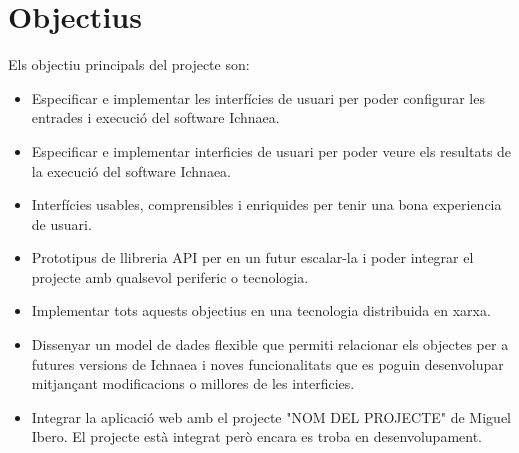 \section{Objectius}
Els objectiu principals del projecte son:

\begin{itemize}
\item Especificar e implementar les interf\'{i}cies de usuari per poder configurar les entrades i execuci\'{o} del software Ichnaea.
\item Especificar e implementar interficies de usuari per poder veure els resultats de la execuci\'{o} del software Ichnaea. 
\item Interf\'{i}cies usables, comprensibles i enriquides per tenir una bona experiencia de usuari. 
\item Prototipus de llibreria API per en un futur escalar-la i poder integrar el projecte amb qualsevol periferic o tecnologia. 
\item Implementar tots aquests objectius en una tecnologia distribuida en xarxa. 
\item Dissenyar un model de dades flexible que permiti relacionar els objectes per a futures versions de Ichnaea i noves funcionalitats que es poguin desenvolupar mitjançant modificacions o millores de les interficies. 
\item Integrar la aplicaci\'{o} web amb el projecte "NOM DEL PROJECTE" de Miguel Ibero. El projecte est\`{a} integrat per\`{o} encara es troba en desenvolupament. 
\end{itemize}
